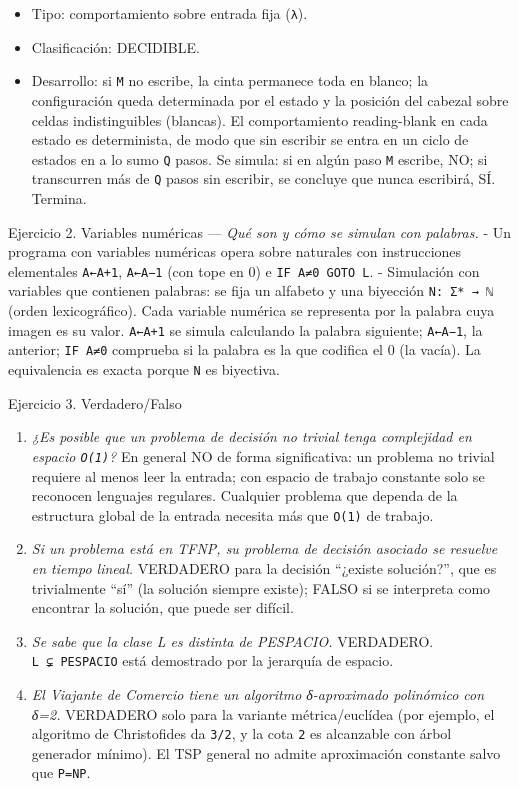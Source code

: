 \documentclass[12pt]{book} %
\providecommand{\tightlist}{%
  \setlength{\itemsep}{0pt}\setlength{\parskip}{0pt}}
\begin{document}
\begin{enumerate}
  \begin{itemize}
  \tightlist
  \item
    Tipo: comportamiento sobre entrada fija (\texttt{λ}).
  \item
    Clasificación: DECIDIBLE.
  \item
    Desarrollo: si \texttt{M} no escribe, la cinta permanece toda en
    blanco; la configuración queda determinada por el estado y la
    posición del cabezal sobre celdas indistinguibles (blancas). El
    comportamiento reading-blank en cada estado es determinista, de modo
    que sin escribir se entra en un ciclo de estados en a lo sumo
    \texttt{\textbar{}Q\textbar{}} pasos. Se simula: si en algún paso
    \texttt{M} escribe, NO; si transcurren más de
    \texttt{\textbar{}Q\textbar{}} pasos sin escribir, se concluye que
    nunca escribirá, SÍ. Termina.
  \end{itemize}
\end{enumerate}

Ejercicio 2. Variables numéricas --- \emph{Qué son y cómo se simulan con
palabras.} - Un programa con variables numéricas opera sobre naturales
con instrucciones elementales \texttt{A←A+1}, \texttt{A←A−1} (con tope
en 0) e \texttt{IF\ A≠0\ GOTO\ L}. - Simulación con variables que
contienen palabras: se fija un alfabeto y una biyección
\texttt{N:\ Σ*\ →\ ℕ} (orden lexicográfico). Cada variable numérica se
representa por la palabra cuya imagen es su valor. \texttt{A←A+1} se
simula calculando la palabra siguiente; \texttt{A←A−1}, la anterior;
\texttt{IF\ A≠0} comprueba si la palabra es la que codifica el 0 (la
vacía). La equivalencia es exacta porque \texttt{N} es biyectiva.

Ejercicio 3. Verdadero/Falso

\begin{enumerate}
\def\labelenumi{\arabic{enumi}.}
\tightlist
\item
  \emph{¿Es posible que un problema de decisión no trivial tenga
  complejidad en espacio \texttt{O(1)}?} En general NO de forma
  significativa: un problema no trivial requiere al menos leer la
  entrada; con espacio de trabajo constante solo se reconocen lenguajes
  regulares. Cualquier problema que dependa de la estructura global de
  la entrada necesita más que \texttt{O(1)} de trabajo.
\item
  \emph{Si un problema está en TFNP, su problema de decisión asociado se
  resuelve en tiempo lineal.} VERDADERO para la decisión ``¿existe
  solución?'', que es trivialmente ``sí'' (la solución siempre existe);
  FALSO si se interpreta como encontrar la solución, que puede ser
  difícil.
\item
  \emph{Se sabe que la clase L es distinta de PESPACIO.} VERDADERO.
  \texttt{L\ ⊊\ PESPACIO} está demostrado por la jerarquía de espacio.
\item
  \emph{El Viajante de Comercio tiene un algoritmo δ-aproximado
  polinómico con δ=2.} VERDADERO solo para la variante métrica/euclídea
  (por ejemplo, el algoritmo de Christofides da \texttt{3/2}, y la cota
  \texttt{2} es alcanzable con árbol generador mínimo). El TSP general
  no admite aproximación constante salvo que \texttt{P=NP}.
\end{enumerate}
\end{document}

